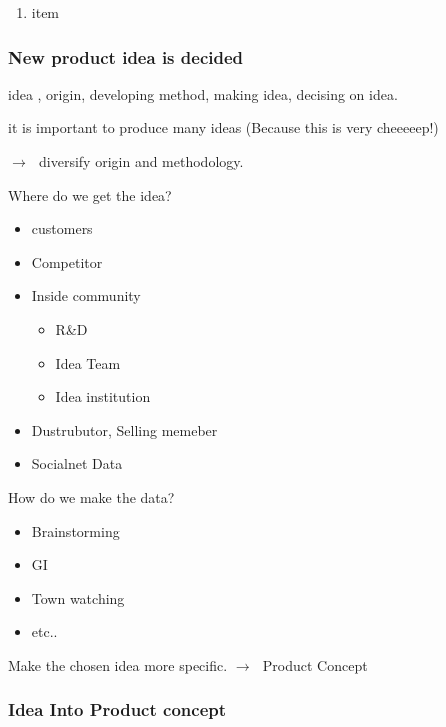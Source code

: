 \documentclass[12pt]{article}
\newcommand{\ra}{$\rightarrow \text{ }$}
\newcommand{\nii}{\noindent}
\begin{document}
\begin{enumerate}
	\item item

\end{enumerate}

\subsubsection{New product idea is decided}

idea , origin, developing method, making idea, decising on idea.

it is important to produce many ideas (Because this is very cheeeeep!)

\ra diversify origin and methodology.

Where do we get the idea?

\begin{itemize}
	\item customers
	\item Competitor
	\item Inside community \\
	\begin{itemize}
		\item R&D
		\item Idea Team
		\item Idea institution
	\end{itemize}
	\item Dustrubutor, Selling memeber
	\item Socialnet Data
\end{itemize}
\nii
How do we make the data?
\begin{itemize}
	\item Brainstorming
	\item GI
	\item Town watching
	\item etc..
\end{itemize}

\begin{center}{
	\luge Make the chosen idea more specific.
	\ra Product Concept
	}

\end{center}






\subsubsection{Idea Into Product concept}
\end{document}
